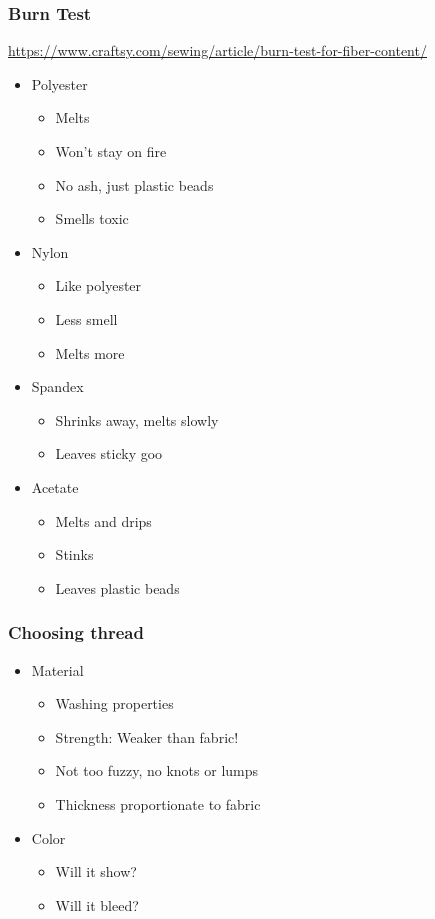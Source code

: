 \documentclass{beamer}
\begin{document}
\begin{frame}[fragile]
\frametitle{Burn Test}
\url{https://www.craftsy.com/sewing/article/burn-test-for-fiber-content/}
\begin{itemize}
\item Polyester
    \begin{itemize}
        \item Melts
        \item Won't stay on fire
        \item No ash, just plastic beads
        \item Smells toxic
    \end{itemize}
\item Nylon
    \begin{itemize}
        \item Like polyester
        \item Less smell
        \item Melts more
    \end{itemize}
\item Spandex
    \begin{itemize}
        \item Shrinks away, melts slowly
        \item Leaves sticky goo
    \end{itemize}
\item Acetate
    \begin{itemize}
        \item Melts and drips
        \item Stinks
        \item Leaves plastic beads
    \end{itemize}
\end{itemize}
\end{frame}

\begin{frame}[fragile]
\frametitle{Choosing thread}
    \begin{itemize}
    \item Material
        \begin{itemize}
            \item Washing properties
            \item Strength: Weaker than fabric!
            \item Not too fuzzy, no knots or lumps
            \item Thickness proportionate to fabric
        \end{itemize}
    \item Color
        \begin{itemize}
            \item Will it show?
            \item Will it bleed?
        \end{itemize}
    \end{itemize}
\end{frame}
\end{document}
